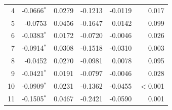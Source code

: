 \begin{longtable}{rrrrrr}
4 & -0.0666$^{*}$ & 0.0279 & -0.1213 & -0.0119 & 0.017 \\
5 & -0.0753 & 0.0456 & -0.1647 & 0.0142 & 0.099 \\
6 & -0.0383$^{*}$ & 0.0172 & -0.0720 & -0.0046 & 0.026 \\
7 & -0.0914$^{*}$ & 0.0308 & -0.1518 & -0.0310 & 0.003 \\
8 & -0.0452 & 0.0270 & -0.0981 & 0.0078 & 0.095 \\
9 & -0.0421$^{*}$ & 0.0191 & -0.0797 & -0.0046 & 0.028 \\
10 & -0.0909$^{*}$ & 0.0231 & -0.1362 & -0.0455 & $<$0.001 \\
11 & -0.1505$^{*}$ & 0.0467 & -0.2421 & -0.0590 & 0.001 \\
\end{longtable}

